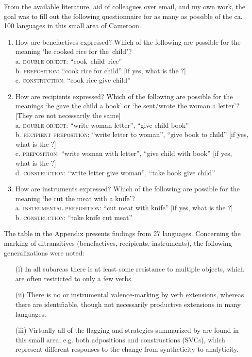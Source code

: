 \documentclass[output=paper]{langsci/langscibook}
\begin{document}
From the available literature, aid of colleagues over email, and my own work, the goal was to fill out the following questionnaire for as many as possible of the ca. 100  languages in this small area of Cameroon.\newpage
\begin{enumerate}
\item
How are benefactives expressed? Which of the following are possible for the meaning ‘he cooked rice for the~child’?\\
  a.  \textsc{double object}: “cook~child~rice” \\
  b.  \textsc{ preposition}: “cook rice for child” [if yes, what is the ?]\\
  c.  \textsc{ construction}: “cook rice give child” 
\item 
How are recipients expressed? Which of the following are possible for the meanings ‘he gave the child a book’ or ‘he sent/wrote the woman a letter’? [They are not necessarily the same]\\
  a.  \textsc{double object}: “write woman letter”, “give child book”\\
  b.  \textsc{recipient preposition}: “write letter to woman”, “give book to child” [if yes, what is the ?] \\
  c.  \textsc{ preposition}: “write woman with letter”, “give child with book” [if yes, what is the ?]\\
  d.  \textsc{ construction}: “write letter give woman”, “take book give child”
\item     
How are instruments expressed? Which of the following are possible for the meaning ‘he cut the meat with a knife’?\\
  a.  \textsc{instrumental preposition}: “cut meat with knife” [if yes, what is the ?] \\
  b.  \textsc{ construction}: “take knife cut meat”
\end{enumerate}

  The table in the Appendix presents findings from 27 languages. Concerning the marking of ditransitives (benefactives, recipients, instruments), the following generalizations were noted:
  \begin{itemize}
\item[(i)] In all subareas there is at least some resistance to multiple objects, which are often restricted to only a few verbs.
\item[(ii)] There is no  or instrumental valence-marking by verb extensions, whereas there are identifiable, though not necessarily productive  extensions in many  languages.
\item[(iii)] Virtually all of the flagging and  strategies summarized by \citet{Malchukov2010} are found in this small area, e.g. both adpositions and  constructions (SVCs), which represent different responses to the change from syntheticity to analyticity.
\end{itemize}
\end{document}
